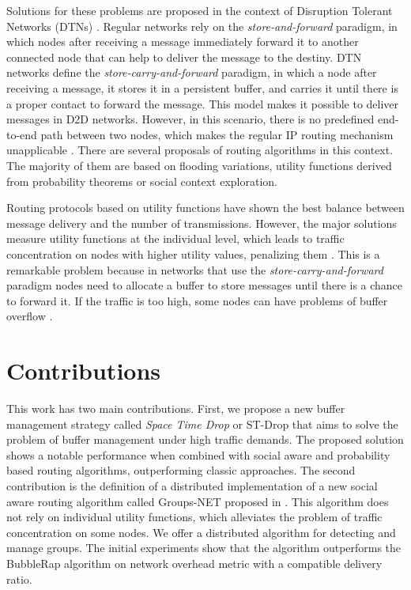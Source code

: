 Solutions for these problems are proposed in the context of Disruption Tolerant Networks (DTNs) \citep{fall2003delay}. Regular networks rely on the \textit{store-and-forward} paradigm, in which nodes after receiving a message immediately forward it to another connected node that can help to deliver the message to the destiny. DTN networks define the \textit{store-carry-and-forward} paradigm, in which a node after receiving a message, it stores it in a persistent buffer, and carries it until there is a proper contact to forward the message. This model makes it possible to deliver messages in D2D networks. However, in this scenario, there is no predefined end-to-end path between two nodes, which makes the regular IP routing mechanism unapplicable \citep{misra2016opportunistic}. There are several proposals of routing algorithms in this context. The majority of them are based on flooding variations, utility functions derived from probability theorems or social context exploration.

Routing protocols based on utility functions have shown the best balance between message delivery and the number of transmissions. However, the major solutions measure utility functions at the individual level, which leads to traffic concentration on nodes with higher utility values, penalizing them \citep{chilipirea2013energy}. This is a remarkable problem because in networks that use the \textit{store-carry-and-forward} paradigm nodes need to allocate a buffer to store messages until there is a chance to forward it. If the traffic is too high, some nodes can have problems of buffer overflow \citep{silva2015survey}.

\section{Contributions}
\label{sec:intro.objectives}

This work has two main contributions. First, we propose a new buffer management strategy called \textit{Space Time Drop} or ST-Drop that aims to solve the problem of buffer management under high traffic demands. The proposed solution shows a notable performance when combined with social aware and probability based routing algorithms, outperforming classic approaches. The second contribution is the definition of a distributed implementation of a new social aware routing algorithm called Groups-NET proposed in \citep{nunes2016leveraging}. This algorithm does not rely on individual utility functions, which alleviates the problem of traffic concentration on some nodes. We offer a distributed algorithm for detecting and manage groups. The initial experiments show that the algorithm outperforms the BubbleRap algorithm on network overhead metric with a compatible delivery ratio.

